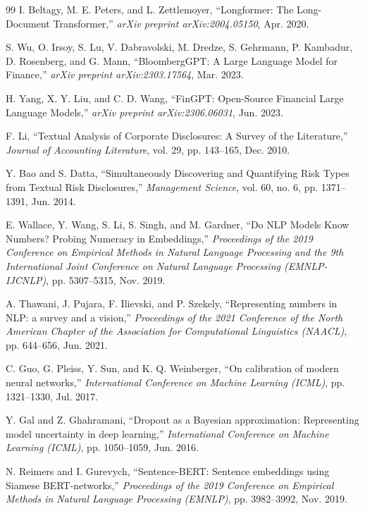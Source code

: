 \documentclass[journal]{IEEEtran}
\begin{document}
\begin{thebibliography}{99}
I. Beltagy, M. E. Peters, and L. Zettlemoyer, ``Longformer: The Long-Document Transformer,'' \textit{arXiv preprint arXiv:2004.05150}, Apr. 2020.

S. Wu, O. Irsoy, S. Lu, V. Dabravolski, M. Dredze, S. Gehrmann, P. Kambadur, D. Rosenberg, and G. Mann, ``BloombergGPT: A Large Language Model for Finance,'' \textit{arXiv preprint arXiv:2303.17564}, Mar. 2023.

H. Yang, X. Y. Liu, and C. D. Wang, ``FinGPT: Open-Source Financial Large Language Models,'' \textit{arXiv preprint arXiv:2306.06031}, Jun. 2023.

F. Li, ``Textual Analysis of Corporate Disclosures: A Survey of the Literature,'' \textit{Journal of Accounting Literature}, vol. 29, pp. 143--165, Dec. 2010.

Y. Bao and S. Datta, ``Simultaneously Discovering and Quantifying Risk Types from Textual Risk Disclosures,'' \textit{Management Science}, vol. 60, no. 6, pp. 1371--1391, Jun. 2014.

E. Wallace, Y. Wang, S. Li, S. Singh, and M. Gardner, ``Do NLP Models Know Numbers? Probing Numeracy in Embeddings,'' \textit{Proceedings of the 2019 Conference on Empirical Methods in Natural Language Processing and the 9th International Joint Conference on Natural Language Processing (EMNLP-IJCNLP)}, pp. 5307--5315, Nov. 2019.

A. Thawani, J. Pujara, F. Ilievski, and P. Szekely, ``Representing numbers in NLP: a survey and a vision,'' \textit{Proceedings of the 2021 Conference of the North American Chapter of the Association for Computational Linguistics (NAACL)}, pp. 644--656, Jun. 2021.

C. Guo, G. Pleiss, Y. Sun, and K. Q. Weinberger, ``On calibration of modern neural networks,'' \textit{International Conference on Machine Learning (ICML)}, pp. 1321--1330, Jul. 2017.

Y. Gal and Z. Ghahramani, ``Dropout as a Bayesian approximation: Representing model uncertainty in deep learning,'' \textit{International Conference on Machine Learning (ICML)}, pp. 1050--1059, Jun. 2016.

N. Reimers and I. Gurevych, ``Sentence-BERT: Sentence embeddings using Siamese BERT-networks,'' \textit{Proceedings of the 2019 Conference on Empirical Methods in Natural Language Processing (EMNLP)}, pp. 3982--3992, Nov. 2019.


\end{thebibliography}
\end{document}
